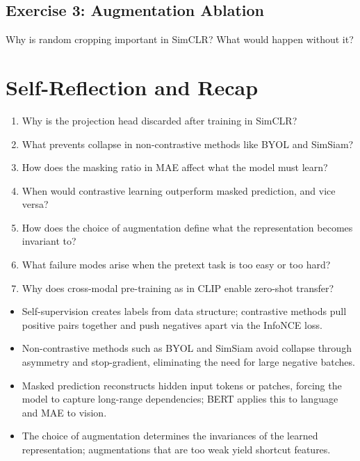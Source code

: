 \subsection{Exercise 3: Augmentation Ablation}

Why is random cropping important in SimCLR? What would happen without it?


\section{Self-Reflection and Recap}


\begin{enumerate}
    \item Why is the projection head discarded after training in SimCLR?
    \item What prevents collapse in non-contrastive methods like BYOL and SimSiam?
    \item How does the masking ratio in MAE affect what the model must learn?
    \item When would contrastive learning outperform masked prediction, and vice versa?
    \item How does the choice of augmentation define what the representation becomes invariant to?
    \item What failure modes arise when the pretext task is too easy or too hard?
    \item Why does cross-modal pre-training as in CLIP enable zero-shot transfer?
\end{enumerate}

\vspace{1.5em}


\begin{itemize}
    \item Self-supervision creates labels from data structure; contrastive methods pull positive pairs together and push negatives apart via the InfoNCE loss.
    \item Non-contrastive methods such as BYOL and SimSiam avoid collapse through asymmetry and stop-gradient, eliminating the need for large negative batches.
    \item Masked prediction reconstructs hidden input tokens or patches, forcing the model to capture long-range dependencies; BERT applies this to language and MAE to vision.
    \item The choice of augmentation determines the invariances of the learned representation; augmentations that are too weak yield shortcut features.
\end{itemize}

